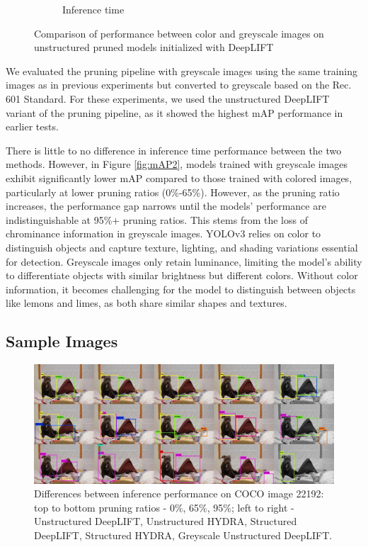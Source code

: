 \documentclass[10pt]{cai}
\begin{document}
\begin{figure}
\begin{subfigure}[b]{.45\textwidth}
      \caption{Inference time}
      \label{fig:time2}
    \end{subfigure}
    \caption{Comparison of performance between color and greyscale images on unstructured pruned models initialized with DeepLIFT}
    \label{fig:result2}
\end{figure}

We evaluated the pruning pipeline with greyscale images using the same training images as in previous experiments but converted to greyscale based on the Rec. 601 Standard. For these experiments, we used the unstructured DeepLIFT variant of the pruning pipeline, as it showed the highest mAP performance in earlier tests.

There is little to no difference in inference time performance between the two methods. However, in Figure \ref{fig:mAP2}, models trained with greyscale images exhibit significantly lower mAP compared to those trained with colored images, particularly at lower pruning ratios (0\%-65\%). However, as the pruning ratio increases, the performance gap narrows until the models' performance are indistinguishable at 95\%+ pruning ratios. This stems from the loss of chrominance information in greyscale images. YOLOv3 relies on color to distinguish objects and capture texture, lighting, and shading variations essential for detection. Greyscale images only retain luminance, limiting the model's ability to differentiate objects with similar brightness but different colors. Without color information, it becomes challenging for the model to distinguish between objects like lemons and limes, as both share similar shapes and textures.

\subsection{Sample Images}

\begin{figure}
    \centering
    \captionsetup{justification=centering}
    \includegraphics[width=1\linewidth]{figs/22192select.jpg}
    \caption{Differences between inference performance on COCO image 22192: top to bottom pruning ratios - 0\%, 65\%, 95\%; left to right - Unstructured DeepLIFT, Unstructured HYDRA, Structured DeepLIFT, Structured HYDRA, Greyscale Unstructured DeepLIFT.}
    \label{fig:22192select}
\end{figure}
\end{document}
